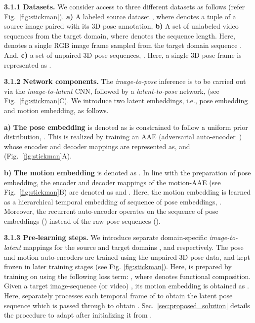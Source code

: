\documentclass{article}
\begin{document}
\textbf{3.1.1\hspace{1mm} Datasets.} We consider access to three different datasets as follows (refer Fig.~\ref{fig:stickman}). 
\textbf{a)} A labeled source dataset , where  denotes a tuple of a source image paired with its 3D pose annotation, 
\textbf{b)} A set of unlabeled video sequences from the target domain,  where  denotes the sequence length. Here,  denotes a single RGB image frame sampled from the target domain sequence . And, 
\textbf{c)} a set of unpaired 3D pose sequences, . Here, a single 3D pose frame is represented as . 

\textbf{3.1.2\hspace{1mm} Network components.} The \textit{image-to-pose} inference is to be carried out via the \textit{image-to-latent} CNN,  followed by a \textit{latent-to-pose} network,  (see Fig.~\ref{fig:stickman}{\color{red}C}). We introduce two latent embeddings, i.e., pose embedding and motion embedding, as follows.

\textbf{a)} \textbf{The pose embedding} is denoted as  is constrained to 
follow a uniform prior distribution, . This is realized by training an AAE (adversarial auto-encoder~\cite{makhzani2015adversarial, kundu2019bihmp, kundu2019unsupervised}) whose encoder and decoder mappings are represented as,  and  (Fig.~\ref{fig:stickman}{\color{red}A}).

\textbf{b)} \textbf{The motion embedding} is denoted as . In line with the preparation of pose embedding, the encoder and decoder mappings of the motion-AAE (see Fig.~\ref{fig:stickman}{\color{red}B}) are denoted as  and . Here, the motion embedding is learned as a hierarchical temporal embedding of sequence of pose embeddings, . Moreover, the recurrent auto-encoder operates on the sequence of pose embeddings () instead of the raw pose sequences ().


\textbf{3.1.3\vspace{1mm} Pre-learning steps.} 
We introduce separate domain-specific \textit{image-to-latent} mappings for the source and target domains \ie,  and  respectively. The pose and motion auto-encoders are trained using the unpaired 3D pose data,  and kept frozen in later training stages (see Fig. \ref{fig:stickman}). Here,  is prepared by training on  using the following loss term: , where  denotes functional composition. Given a target image-sequence (or video) , its motion embedding is obtained as . Here,  separately processes each temporal frame of  to obtain the latent pose sequence  which is passed through  to obtain . Sec.~\ref{sec:proposed_solution} details the procedure to adapt  after initializing it from . 
\end{document}
